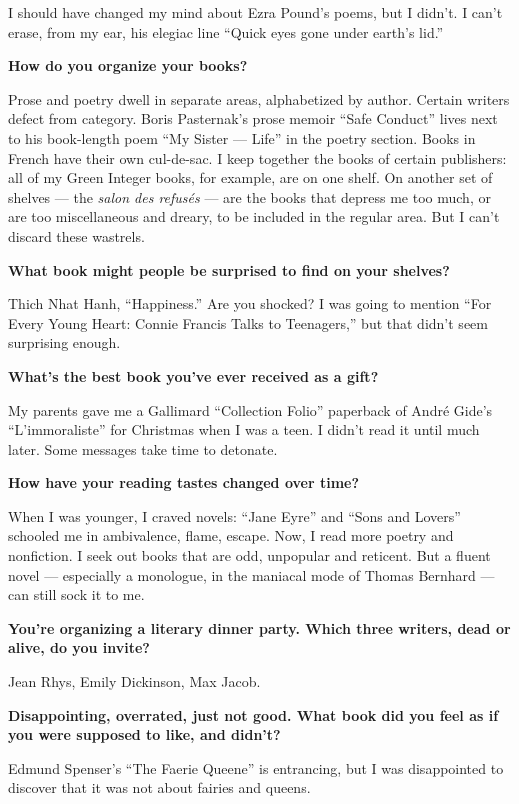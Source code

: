 I should have changed my mind about Ezra Pound's poems, but I didn't. I
can't erase, from my ear, his elegiac line ``Quick eyes gone under
earth's lid.''

\textbf{How do you organize your books?}

Prose and poetry dwell in separate areas, alphabetized by author.
Certain writers defect from category. Boris Pasternak's prose memoir
``Safe Conduct'' lives next to his book-length poem ``My Sister ---
Life'' in the poetry section. Books in French have their own cul-de-sac.
I keep together the books of certain publishers: all of my Green Integer
books, for example, are on one shelf. On another set of shelves --- the
\emph{salon des refusés} --- are the books that depress me too much, or
are too miscellaneous and dreary, to be included in the regular area.
But I can't discard these wastrels.

\textbf{What book might people be surprised to find on your shelves?}

Thich Nhat Hanh, ``Happiness.'' Are you shocked? I was going to mention
``For Every Young Heart: Connie Francis Talks to Teenagers,'' but that
didn't seem surprising enough.

\textbf{What's the best book you've ever received as a gift?}

My parents gave me a Gallimard ``Collection Folio'' paperback of André
Gide's ``L'immoraliste'' for Christmas when I was a teen. I didn't read
it until much later. Some messages take time to detonate.

\textbf{How have your reading tastes changed over time?}

When I was younger, I craved novels: ``Jane Eyre'' and ``Sons and
Lovers'' schooled me in ambivalence, flame, escape. Now, I read more
poetry and nonfiction. I seek out books that are odd, unpopular and
reticent. But a fluent novel --- especially a monologue, in the maniacal
mode of Thomas Bernhard --- can still sock it to me.

\textbf{You're organizing a literary dinner party. Which three writers,
dead or alive, do you invite?}

Jean Rhys, Emily Dickinson, Max Jacob.

\textbf{Disappointing, overrated, just not good. What book did you feel
as if you were supposed to like, and didn't?}

Edmund Spenser's ``The Faerie Queene'' is entrancing, but I was
disappointed to discover that it was not about fairies and queens.

